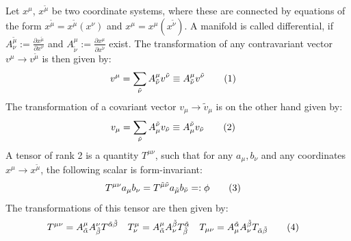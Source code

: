 \documentclass[a4paper,12pt]{article}
\newcommand\numberthis{\addtocounter{equation}{1}\tag{\theequation}}
\begin{document}

Let $x^\mu$, $x^{\tilde{\mu}}$ be two coordinate systems, where these are connected by equations of the form $x^{\tilde{\mu}}=x^{\tilde{\mu}}(x^\nu)$ and $x^\mu=x^\mu(x^{\tilde{\nu}})$. A manifold is called differential, if $A^{\tilde{\mu}}_\nu:=\frac{\partial x^{\tilde{\mu}} }{\partial x^\nu}$ and $A^\mu_{\tilde{\nu}}:=\frac{\partial x^\mu }{\partial x^{\tilde{\nu}}}$ exist. The transformation of any contravariant vector $v^\mu\rightarrow v^{\tilde{\mu}}$ is then given by:
\begin{align*}
v^\mu&=\sum_{\tilde{\nu}} A^\mu_{\tilde{\nu}} v^{\tilde{\nu}}\equiv A^\mu_{\tilde{\nu}} v^{\tilde{\nu}}\numberthis\label{Contravariant transformation}
\end{align*}
The transformation of a covariant vector $v_\mu\rightarrow\tilde{v}_\mu$ is on the other hand given by:
\begin{align*}
v_\mu&=\sum_{\tilde{\nu}} A^{\tilde{\nu}}_\mu v_{\tilde{\nu}}\equiv A^{\tilde{\nu}}_\mu v_{\tilde{\nu}}\numberthis\label{Covariant transformation}
\end{align*}
A tensor of rank 2 is a quantity $T^{\mu\nu}$, such that for any $a_\mu,b_\nu$ and any coordinates $x^\mu\rightarrow x^{\tilde{\mu}}$, the following scalar is form-invariant:
\begin{align*}
T^{\mu\nu}a_\mu b_\nu&=T^{\tilde{\mu}\tilde{\nu}}a_{\tilde{\mu}}b_{\tilde{\nu}} =:\phi\numberthis\label{Tensor rank 2 definition}
\end{align*}
The transformations of this tensor are then given by:
\begin{align*}
T^{\mu\nu}&=A^\mu_{\tilde{\alpha}} A^\nu_{\tilde{\beta}} T^{\tilde{\alpha}\tilde{\beta}}&T^\mu_\nu&=A^\mu_{\tilde{\alpha}} A^{\tilde{\beta}}_\nu T^{\tilde{\alpha}}_{\tilde{\beta}}&T_{\mu\nu}&=A^{\tilde{\alpha}}_\mu A^{\tilde{\beta}}_\nu T_{\tilde{\alpha}\tilde{\beta}}\numberthis\label{Tensor rank 2 transformation}
\end{align*}
\end{document}
